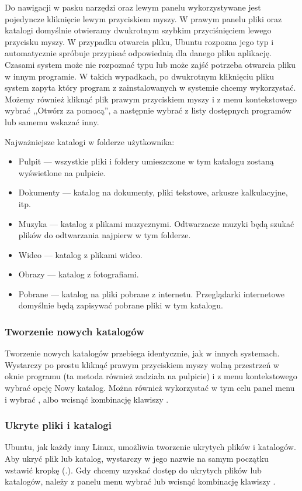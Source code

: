 Do nawigacji w pasku narzędzi oraz lewym panelu wykorzystywane jest pojedyncze kliknięcie lewym przyciskiem myszy. W prawym panelu pliki oraz katalogi domyślnie otwieramy dwukrotnym szybkim przyciśnięciem lewego przycisku myszy. W przypadku otwarcia pliku, Ubuntu rozpozna jego typ i automatycznie spróbuje przypisać odpowiednią dla danego pliku aplikację. Czasami system może nie rozpoznać typu lub może zajść potrzeba otwarcia pliku w innym programie. W takich wypadkach, po dwukrotnym kliknięciu pliku system zapyta który program z zainstalowanych w systemie chcemy wykorzystać. Możemy również kliknąć plik prawym przyciskiem myszy i z menu kontekstowego wybrać ,,Otwórz za pomocą'', a następnie wybrać z listy dostępnych programów lub samemu wskazać inny.

Najważniejsze katalogi w folderze użytkownika:
\begin{itemize}
\item \textcolor{ubuntu_orange}{Pulpit} --- wszystkie pliki i foldery umieszczone w tym katalogu zostaną wyświetlone na pulpicie.
\item \textcolor{ubuntu_orange}{Dokumenty} --- katalog na dokumenty, pliki tekstowe, arkusze kalkulacyjne, itp.
\item \textcolor{ubuntu_orange}{Muzyka} --- katalog z plikami muzycznymi. Odtwarzacze muzyki będą szukać plików do odtwarzania najpierw w tym folderze.
\item \textcolor{ubuntu_orange}{Wideo} --- katalog z plikami wideo.
\item \textcolor{ubuntu_orange}{Obrazy} --- katalog z fotografiami.
\item \textcolor{ubuntu_orange}{Pobrane} --- katalog na pliki pobrane z internetu. Przeglądarki internetowe domyślnie będą zapisywać pobrane pliki w tym katalogu.
\end{itemize}

\subsubsection{Tworzenie nowych katalogów}
Tworzenie nowych katalogów przebiega identycznie, jak w innych systemach. Wystarczy po prostu kliknąć prawym przyciskiem myszy wolną przestrzeń w oknie programu (ta metoda również zadziała na pulpicie) i z menu kontekstowego wybrać opcję \textcolor{ubuntu_orange}{Nowy katalog}. Można również wykorzystać w tym celu panel menu i wybrać , albo wcisnąć kombinację klawiszy .

\subsubsection{Ukryte pliki i katalogi}
Ubuntu, jak każdy inny Linux, umożliwia tworzenie ukrytych plików i katalogów. Aby ukryć plik lub katalog, wystarczy w jego nazwie na samym początku wstawić kropkę (.). Gdy chcemy uzyskać dostęp do ukrytych plików lub katalogów, należy z panelu menu wybrać  lub wcisnąć kombinację klawiszy .

